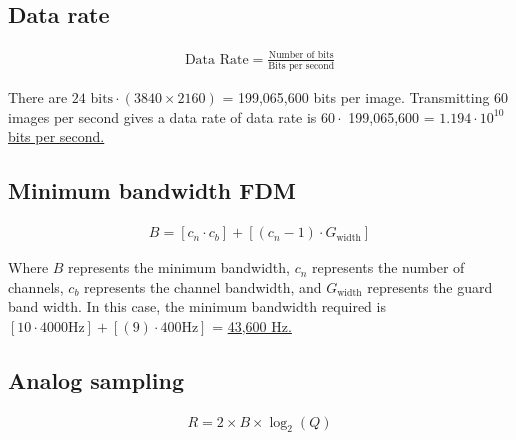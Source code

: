 
\setcounter{section}{3}

\subsection{Data rate}
\begin{align*}
	\text{Data Rate} = \frac{\text{Number of bits}}{\text{Bits per second}}
\end{align*}

There are $24 \text{ bits} \cdot (3840 \times 2160)$ = 199,065,600 bits per image. Transmitting 60 images per second gives a data rate of data rate is $60 \cdot $ 199,065,600 = \ul{$1.194 \cdot 10^{10}$ bits per second.}

\subsection{Minimum bandwidth FDM}
\begin{align*}
	B = [c_n \cdot c_b] + [(c_n - 1) \cdot G_{\text{width}}]
\end{align*}

Where $B$ represents the minimum bandwidth, $c_n$ represents the number of channels, $c_b$ represents the channel bandwidth, and $G_{\text{width}}$ represents the guard band width. In this case, the minimum bandwidth required is $[10 \cdot 4000 \text{Hz}] + [(9) \cdot 400 \text{Hz}]$ = \ul{43,600 Hz.}

\subsection{Analog sampling}
\begin{align*}
	R = 2 \times B \times \log_2(Q)
\end{align*}

